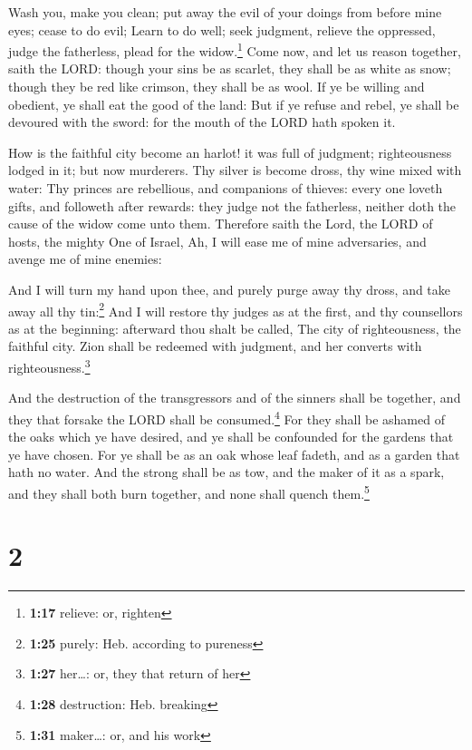  Wash you, make you clean; put away the evil of your
doings from before mine eyes; cease to do evil;  Learn to
do well; seek judgment, relieve the oppressed, judge the fatherless,
plead for the widow.\footnote{\textbf{1:17} relieve: or, righten}
 Come now, and let us reason together, saith the LORD:
though your sins be as scarlet, they shall be as white as snow; though
they be red like crimson, they shall be as wool.  If ye
be willing and obedient, ye shall eat the good of the land:
 But if ye refuse and rebel, ye shall be devoured with
the sword: for the mouth of the LORD hath spoken it.

 How is the faithful city become an harlot! it was full
of judgment; righteousness lodged in it; but now murderers.
 Thy silver is become dross, thy wine mixed with water:
 Thy princes are rebellious, and companions of thieves:
every one loveth gifts, and followeth after rewards: they judge not the
fatherless, neither doth the cause of the widow come unto them.
 Therefore saith the Lord, the LORD of hosts, the mighty
One of Israel, Ah, I will ease me of mine adversaries, and avenge me of
mine enemies:

 And I will turn my hand upon thee, and purely purge away
thy dross, and take away all thy tin:\footnote{\textbf{1:25} purely:
  Heb. according to pureness}  And I will restore thy
judges as at the first, and thy counsellors as at the beginning:
afterward thou shalt be called, The city of righteousness, the faithful
city.  Zion shall be redeemed with judgment, and her
converts with righteousness.\footnote{\textbf{1:27} her\ldots: or, they
  that return of her}

 And the destruction of the transgressors and of the
sinners shall be together, and they that forsake the LORD shall be
consumed.\footnote{\textbf{1:28} destruction: Heb. breaking}
 For they shall be ashamed of the oaks which ye have
desired, and ye shall be confounded for the gardens that ye have chosen.
 For ye shall be as an oak whose leaf fadeth, and as a
garden that hath no water.  And the strong shall be as
tow, and the maker of it as a spark, and they shall both burn together,
and none shall quench them.\footnote{\textbf{1:31} maker\ldots: or, and
  his work}

\hypertarget{section-1}{%
\section{2}\label{section-1}}

